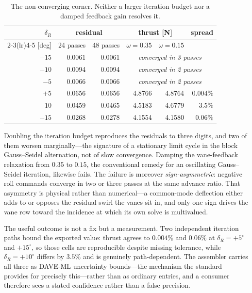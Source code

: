 \documentclass[11pt,a4paper]{article}
\newcommand{\dg}{^\circ}
\begin{document}
\begin{table}[htbp]
\centering
\caption{The non-converging corner. Neither a larger iteration budget nor
a damped feedback gain resolves it.}
\label{tab:nonconv}
\begin{tabular}{@{}rrrrrr@{}}
\toprule
$\delta_R$ & \multicolumn{2}{c}{residual} & \multicolumn{2}{c}{thrust
[N]} & spread \\
\cmidrule(lr){2-3}\cmidrule(lr){4-5}
[deg] & 24 passes & 48 passes & $\omega = 0.35$ & $\omega = 0.15$ & \\
\midrule
$-15$ & 0.0061 & 0.0061 & \multicolumn{3}{c}{\itshape converged in 3
passes} \\
$-10$ & 0.0094 & 0.0094 & \multicolumn{3}{c}{\itshape converged in 2
passes} \\
$-5$ & 0.0066 & 0.0066 & \multicolumn{3}{c}{\itshape converged in 2
passes} \\
\addlinespace
$+5$ & 0.0656 & 0.0656 & 4.8766 & 4.8764 & 0.004\% \\
$+10$ & 0.0459 & 0.0465 & 4.5183 & 4.6779 & 3.5\% \\
$+15$ & 0.0268 & 0.0278 & 4.1554 & 4.1580 & 0.06\% \\
\bottomrule
\end{tabular}
\end{table}

Doubling the iteration budget reproduces the residuals to three digits,
and two of them worsen marginally---the signature of a stationary limit
cycle in the block Gauss--Seidel alternation, not of slow convergence.
Damping the vane-feedback relaxation from $0.35$ to $0.15$, the
conventional remedy for an oscillating Gauss--Seidel iteration, likewise
fails. The failure is moreover \emph{sign-asymmetric}: negative roll
commands converge in two or three passes at the same advance ratio. That
asymmetry is physical rather than numerical---a common-mode deflection
either adds to or opposes the residual swirl the vanes sit in, and only
one sign drives the vane row toward the incidence at which its own solve
is multivalued.

The useful outcome is not a fix but a measurement. Two independent
iteration paths bound the exported value: thrust agrees to $0.004\%$ and
$0.06\%$ at $\delta_R = +5\dg$ and $+15\dg$, so those cells are
reproducible despite missing tolerance, while $\delta_R = +10\dg$ differs
by $3.5\%$ and is genuinely path-dependent. The assembler carries all
three as DAVE-ML uncertainty bounds---the mechanism the standard provides
for precisely this---rather than as ordinary entries, and a consumer
therefore sees a stated confidence rather than a false precision.
\end{document}
